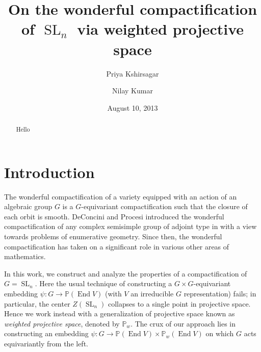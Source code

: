 \documentclass{amsart}
\newcommand{\Proj}{\mathbb{P}}
\DeclareMathOperator{\End}{End}
\DeclareMathOperator{\SL}{SL}
\theoremstyle{definition}
\theoremstyle{remark}
\numberwithin{equation}{section}
\begin{document}
\title{On the wonderful compactification of $\SL_n$ via weighted projective space}

\author{Priya Kshirsagar}
\address{Department of Mathematics, University of California Berkeley, Berkeley, California 94704}

\author{Nilay Kumar}
\address{Department of Mathematics, Columbia University, New York, New York 10027}


\date{August 10, 2013}



\begin{abstract}
Hello
\end{abstract}

\maketitle

\section{Introduction}

The wonderful compactification of a variety equipped with an action of an algebraic group $G$ is a $G$-equivariant compactification such that the closure of each orbit is smooth.
DeConcini and Procesi introduced the wonderful compactification of any complex semisimple group of adjoint type in \cite{CSV} with a view towards problems of enumerative geometry. Since then, the wonderful compactification has taken on a significant role in various other areas of mathematics.

In this work, we construct and analyze the properties of a compactification of $G=\SL_n$. Here the usual technique of constructing a $G\times G$-equivariant embedding $\psi:G\to\Proj(\End V)$ (with $V$ an irreducible $G$ representation) fails; in particular, the center $Z(\SL_n)$ collapses to a single point in projective space. Hence we work instead with a generalization of projective space known as \textit{weighted projective space}, denoted by $\Proj_w$. The crux of our approach lies in constructing an embedding $\psi:G\to \Proj(\End V)\times\Proj_w(\End V)$ on which $G$ acts equivariantly from the left.
\end{document}
